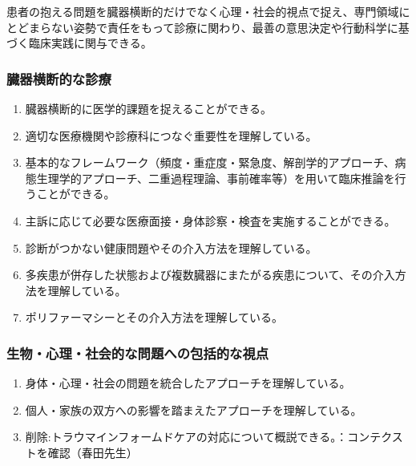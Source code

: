 患者の抱える問題を臓器横断的だけでなく心理・社会的視点で捉え、専門領域にとどまらない姿勢で責任をもって診療に関わり、最善の意思決定や行動科学に基づく臨床実践に関与できる。

\hypertarget{ux81d3ux5668ux6a2aux65adux7684ux306aux8a3aux7642}{%
\subsubsection{臓器横断的な診療}\label{ux81d3ux5668ux6a2aux65adux7684ux306aux8a3aux7642}}

\begin{enumerate}
\def\labelenumi{\arabic{enumi}.}
\tightlist
\item
  臓器横断的に医学的課題を捉えることができる。
\item
  適切な医療機関や診療科につなぐ重要性を理解している。
\item
  基本的なフレームワーク（頻度・重症度・緊急度、解剖学的アプローチ、病態生理学的アプローチ、二重過程理論、事前確率等）を用いて臨床推論を行うことができる。
\item
  主訴に応じて必要な医療面接・身体診察・検査を実施することができる。
\item
  診断がつかない健康問題やその介入方法を理解している。
\item
  多疾患が併存した状態および複数臓器にまたがる疾患について、その介入方法を理解している。
\item
  ポリファーマシーとその介入方法を理解している。
\end{enumerate}

\hypertarget{ux751fux7269ux5fc3ux7406ux793eux4f1aux7684ux306aux554fux984cux3078ux306eux5305ux62ecux7684ux306aux8996ux70b9}{%
\subsubsection{生物・心理・社会的な問題への包括的な視点}\label{ux751fux7269ux5fc3ux7406ux793eux4f1aux7684ux306aux554fux984cux3078ux306eux5305ux62ecux7684ux306aux8996ux70b9}}

\begin{enumerate}
\def\labelenumi{\arabic{enumi}.}
\tightlist
\item
  身体・心理・社会の問題を統合したアプローチを理解している。
\item
  個人・家族の双方への影響を踏まえたアプローチを理解している。
\item
  削除:トラウマインフォームドケアの対応について概説できる。：コンテクストを確認（春田先生）
\end{enumerate}

